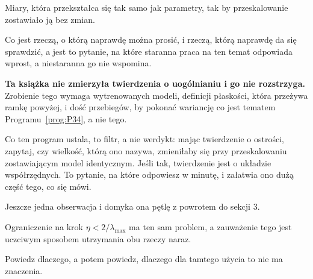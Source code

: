 \begin{fr}
\begin{ansblock}
Miary, która przekształca się tak samo jak parametry, tak by przeskalowanie
zostawiało ją bez zmian.
\end{ansblock}

Co jest rzeczą, o którą naprawdę można prosić, i rzeczą, którą naprawdę da się
sprawdzić, a jest to pytanie, na które staranna praca na ten temat odpowiada
wprost, a niestaranna go nie wspomina.

\begin{warning}
\textbf{Ta książka nie zmierzyła twierdzenia o uogólnianiu i go nie
rozstrzyga.} Zrobienie tego wymaga wytrenowanych modeli, definicji płaskości,
która przeżywa ramkę powyżej, i dość przebiegów, by pokonać wariancję
\dash{} co jest tematem Programu~\ref{prog:P34}, a nie tego.

Co ten program ustala, to filtr, a nie werdykt: mając twierdzenie o ostrości,
zapytaj, czy wielkość, którą ono nazywa, zmieniłaby się przy przeskalowaniu
zostawiającym model identycznym. Jeśli tak, twierdzenie jest o układzie
współrzędnych. To pytanie, na które odpowiesz w minutę, i załatwia ono dużą
część tego, co się mówi.
\end{warning}
\end{fr}

\begin{fr}
Jeszcze jedna obserwacja i domyka ona pętlę z powrotem do sekcji 3.

Ograniczenie na krok $\eta < 2/\lambda_{\max}$ ma ten sam problem, a zauważenie
tego jest uczciwym sposobem utrzymania obu rzeczy naraz.

Powiedz dlaczego, a potem powiedz, dlaczego dla tamtego użycia to nie ma
znaczenia.
\dotline
\nextframe
\end{fr}

